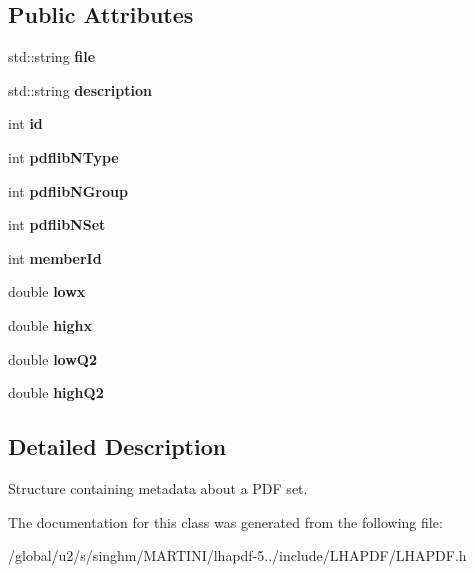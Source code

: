 \subsection*{Public Attributes}
\begin{DoxyCompactItemize}
\item 
\mbox{\label{classLHAPDF_1_1PDFSetInfo_aac962eb2e5b4691e291b6f325ba7bcce}} 
std\+::string {\bfseries file}
\item 
\mbox{\label{classLHAPDF_1_1PDFSetInfo_ab3dd720d2a24a6c175b48501b7fae2cf}} 
std\+::string {\bfseries description}
\item 
\mbox{\label{classLHAPDF_1_1PDFSetInfo_a61d25c7ee6738960d35d3ce47ba7c0ed}} 
int {\bfseries id}
\item 
\mbox{\label{classLHAPDF_1_1PDFSetInfo_a141325e4fe9167eee317ba292aaed716}} 
int {\bfseries pdflib\+N\+Type}
\item 
\mbox{\label{classLHAPDF_1_1PDFSetInfo_a6f68b03401f6e36a5f4057bcc513f931}} 
int {\bfseries pdflib\+N\+Group}
\item 
\mbox{\label{classLHAPDF_1_1PDFSetInfo_ac085200cde3157b4070a01ec94b7ac3f}} 
int {\bfseries pdflib\+N\+Set}
\item 
\mbox{\label{classLHAPDF_1_1PDFSetInfo_ab0cdf3ef62a2ca5a429c7afd07369ada}} 
int {\bfseries member\+Id}
\item 
\mbox{\label{classLHAPDF_1_1PDFSetInfo_a7a7b5153e280c290af0f77c37b12e2af}} 
double {\bfseries lowx}
\item 
\mbox{\label{classLHAPDF_1_1PDFSetInfo_aa5271aeb4100550171dc95bd75bd93c1}} 
double {\bfseries highx}
\item 
\mbox{\label{classLHAPDF_1_1PDFSetInfo_ae8f1cba5caeb50e84688a6087612ce31}} 
double {\bfseries low\+Q2}
\item 
\mbox{\label{classLHAPDF_1_1PDFSetInfo_abbf8a1a1003243affed6d7e24007f5d6}} 
double {\bfseries high\+Q2}
\end{DoxyCompactItemize}


\subsection{Detailed Description}
Structure containing metadata about a P\+DF set. 

The documentation for this class was generated from the following file\+:\begin{DoxyCompactItemize}
\item 
/global/u2/s/singhm/\+M\+A\+R\+T\+I\+N\+I/lhapdf-\/5../include/\+L\+H\+A\+P\+D\+F/L\+H\+A\+P\+D\+F.\+h\end{DoxyCompactItemize}
